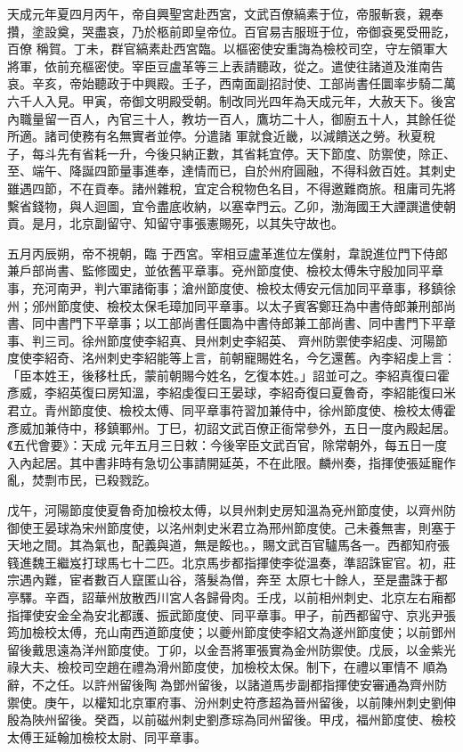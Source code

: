 
\begin{pinyinscope}

 天成元年夏四月丙午，帝自興聖宮赴西宮，文武百僚縞素于位，帝服斬衰，親奉攢，塗設奠，哭盡哀，乃於柩前即皇帝位。百官易吉服班于位，帝御袞冕受冊訖，百僚
 稱賀。丁未，群官縞素赴西宮臨。以樞密使安重誨為檢校司空，守左領軍大將軍，依前充樞密使。宰臣豆盧革等三上表請聽政，從之。遣使往諸道及淮南告哀。辛亥，帝始聽政于中興殿。壬子，西南面副招討使、工部尚書任圜率步騎二萬六千人入見。甲寅，帝御文明殿受朝。制改同光四年為天成元年，大赦天下。後宮內職量留一百人，內官三十人，教坊一百人，鷹坊二十人，御廚五十人，其餘任從所適。諸司使務有名無實者並停。分遣諸
 軍就食近畿，以減饋送之勞。秋夏稅子，每斗先有省耗一升，今後只納正數，其省耗宜停。天下節度、防禦使，除正、至、端午、降誕四節量事進奉，達情而已，自於州府圓融，不得科斂百姓。其刺史雖遇四節，不在貢奉。諸州雜稅，宜定合稅物色名目，不得邀難商旅。租庸司先將繫省錢物，與人迴圖，宜令盡底收納，以塞幸門云。乙卯，渤海國王大諲譔遣使朝貢。是月，北京副留守、知留守事張憲賜死，以其失守故也。



 五月丙辰朔，帝不視朝，臨
 于西宮。宰相豆盧革進位左僕射，韋說進位門下侍郎兼戶部尚書、監修國史，並依舊平章事。兗州節度使、檢校太傅朱守殷加同平章事，充河南尹，判六軍諸衛事；滄州節度使、檢校太傅安元信加同平章事，移鎮徐州；邠州節度使、檢校太保毛璋加同平章事。以太子賓客鄭玨為中書侍郎兼刑部尚書、同中書門下平章事；以工部尚書任圜為中書侍郎兼工部尚書、同中書門下平章事、判三司。徐州節度使李紹真、貝州刺史李紹英、
 齊州防禦使李紹虔、河陽節度使李紹奇、洺州刺史李紹能等上言，前朝寵賜姓名，今乞還舊。內李紹虔上言：「臣本姓王，後移杜氏，蒙前朝賜今姓名，乞復本姓。」詔並可之。李紹真復曰霍彥威，李紹英復曰房知溫，李紹虔復曰王晏球，李紹奇復曰夏魯奇，李紹能復曰米君立。青州節度使、檢校太傅、同平章事符習加兼侍中，徐州節度使、檢校太傅霍彥威加兼侍中，移鎮鄆州。丁巳，初詔文武百僚正衙常參外，五日一度內殿起居。《五代會要》：天成
 元年五月三日敕：今後宰臣文武百官，除常朝外，每五日一度入內起居。其中書非時有急切公事請開延英，不在此限。麟州奏，指揮使張延寵作亂，焚剽市民，已殺戮訖。



 戊午，河陽節度使夏魯奇加檢校太傅，以貝州刺史房知溫為兗州節度使，以齊州防御使王晏球為宋州節度使，以洺州刺史米君立為邢州節度使。己未養無害，則塞于天地之間。其為氣也，配義與道，無是餒也。，賜文武百官驢馬各一。西都知府張篯進魏王繼岌打球馬七十二匹。北京馬步都指揮使李從溫奏，準詔誅宦官。初，莊宗遇內難，宦者數百人竄匿山谷，落髮為僧，奔至
 太原七十餘人，至是盡誅于都亭驛。辛酉，詔華州放散西川宮人各歸骨肉。壬戌，以前相州刺史、北京左右廂都指揮使安金全為安北都護、振武節度使、同平章事。甲子，前西都留守、京兆尹張筠加檢校太傅，充山南西道節度使；以夔州節度使李紹文為遂州節度使；以前鄧州留後戴思遠為洋州節度使。丁卯，以金吾將軍張實為金州防禦使。戊辰，以金紫光祿大夫、檢校司空趙在禮為滑州節度使，加檢校太保。制下，在禮以軍情不
 順為辭，不之任。以許州留後陶為鄧州留後，以諸道馬步副都指揮使安審通為齊州防禦使。庚午，以權知北京軍府事、汾州刺史符彥超為晉州留後，以前陳州刺史劉伸殷為陜州留後。癸酉，以前磁州刺史劉彥琮為同州留後。甲戌，福州節度使、檢校太傅王延翰加檢校太尉、同平章事。



\end{pinyinscope}
